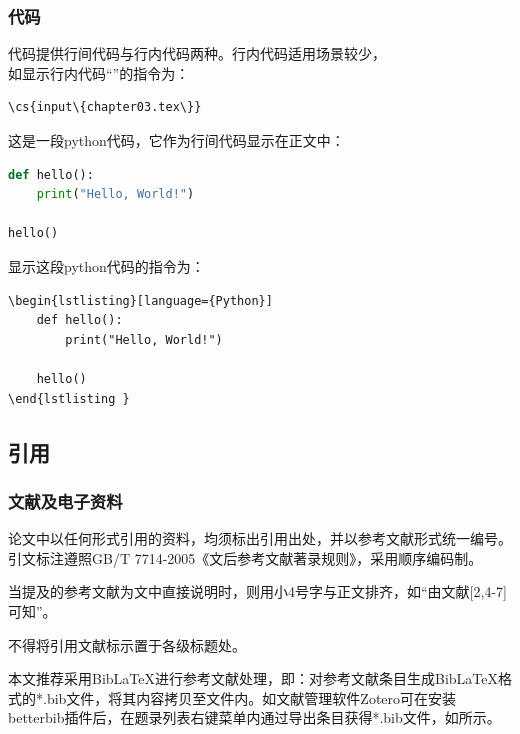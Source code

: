 \subsubsection{代码}

代码提供行间代码与行内代码两种。行内代码适用场景较少，\\
如显示行内代码“”的指令为：

\begin{lstlisting}[language={[LaTeX]TeX}]
\cs{input\{chapter03.tex\}}
\end{lstlisting}
\vspace{2em}
这是一段python代码，它作为行间代码显示在正文中：

\begin{lstlisting}[language={Python}]
def hello():
    print("Hello, World!")

hello()
\end{lstlisting}

显示这段python代码的指令为：

\begin{lstlisting}[language={[LaTeX]TeX}]
\begin{lstlisting}[language={Python}]
    def hello():
        print("Hello, World!")
    
    hello()
\end{lstlisting }
\end{lstlisting}

\subsection{引用}

\subsubsection{文献及电子资料}

论文中以任何形式引用的资料，均须标出引用出处，并以参考文献形式统一编号。引文标注遵照GB/T 7714-2005《文后参考文献著录规则\cite{QuanGuoXin2005WenHouCanKaoWenXianZhuLuGuiZe}》，采用顺序编码制。

当提及的参考文献为文中直接说明时，则用小4号字与正文排齐，如“由文献[2,4-7]可知”。

不得将引用文献标示置于各级标题处。

本文推荐采用BibLaTeX进行参考文献处理，即：对参考文献条目生成BibLaTeX格式的*.bib文件，将其内容拷贝至文件内。如文献管理软件Zotero可在安装betterbib插件后，在题录列表右键菜单内通过导出条目获得*.bib文件，如所示。

